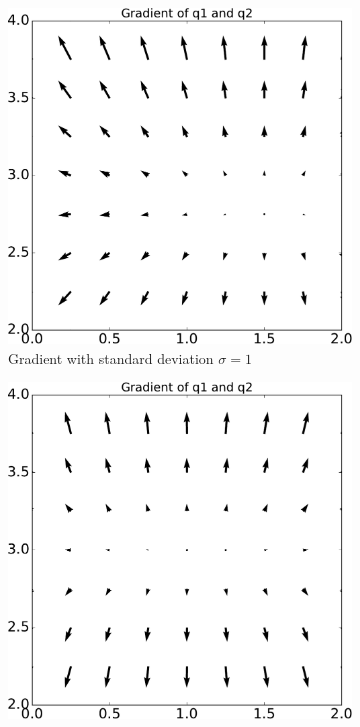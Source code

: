 \begin{figure}
	\centering
	\begin{subfigure}{.5\textwidth}
		\centering
		\includegraphics[width=\textwidth]{figures/linear_systems/gradient_2d_narrow_prior}
		\caption{Gradient with standard deviation $\sigma = 1$}
		\label{fig:linear_system.prior_influence.narrow}
	\end{subfigure}%
	\begin{subfigure}{.5\textwidth}
		\centering
		\includegraphics[width=\textwidth]{figures/linear_systems/gradient_2d_wide_prior}

\end{subfigure}
\end{figure}
